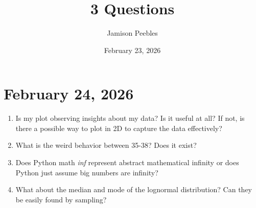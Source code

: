 \documentclass{article}
\title{3 Questions}
\author{Jamison Peebles}
\date{February 23, 2026}
\begin{document}
\maketitle

\section{February 24, 2026}
\begin{enumerate}
    \item Is my plot observing insights about my data? Is it useful at all? If not, is there a possible way to plot in 2D to capture the data effectively?
    \item What is the weird behavior between 35-38? Does it exist?
    \item Does Python math \textit{inf} represent abstract mathematical infinity or does Python just assume big numbers are infinity?
    \item What about the median and mode of the lognormal distribution? Can they be easily found by sampling?
\end{enumerate}
\end{document}
